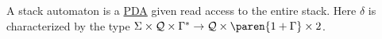 A stack automaton is a \hyperref[sec:zoo-str/pda]{PDA} given read access to
the entire stack.  Here $\delta$ is characterized by the type $\Sigma
\times \mathcal{Q} \times \Gamma^* \to \mathcal{Q} \times
\paren{1 + \Gamma} \times 2$.
